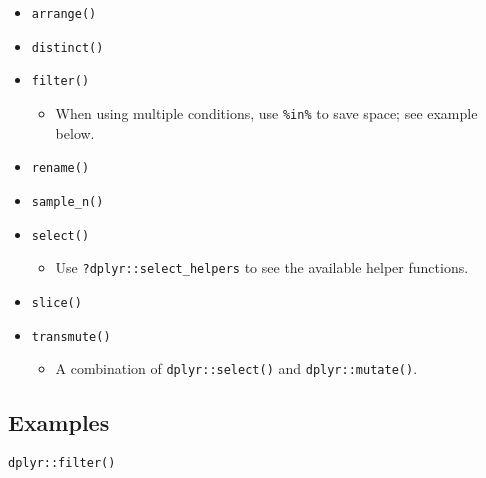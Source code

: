 \documentclass[
]{book}
\newenvironment{Shaded}{\begin{snugshade}}{\end{snugshade}}
\newcommand{\KeywordTok}[1]{\textcolor[rgb]{0.13,0.29,0.53}{\textbf{#1}}}
\newcommand{\NormalTok}[1]{#1}
\newcommand{\OperatorTok}[1]{\textcolor[rgb]{0.81,0.36,0.00}{\textbf{#1}}}
\newcommand{\StringTok}[1]{\textcolor[rgb]{0.31,0.60,0.02}{#1}}
\providecommand{\tightlist}{%
  \setlength{\itemsep}{0pt}\setlength{\parskip}{0pt}}
\begin{document}
\begin{itemize}
\tightlist
\item
  \texttt{arrange()}
\item
  \texttt{distinct()}
\item
  \texttt{filter()}

  \begin{itemize}
  \tightlist
  \item
    When using multiple \texttt{\textbar{}} conditions, use \texttt{\%in\%} to save space; see example below.
  \end{itemize}
\item
  \texttt{rename()}
\item
  \texttt{sample\_n()}
\item
  \texttt{select()}

  \begin{itemize}
  \tightlist
  \item
    Use \texttt{?dplyr::select\_helpers} to see the available helper functions.
  \end{itemize}
\item
  \texttt{slice()}
\item
  \texttt{transmute()}

  \begin{itemize}
  \tightlist
  \item
    A combination of \texttt{dplyr::select()} and \texttt{dplyr::mutate()}.
  \end{itemize}
\end{itemize}

\hypertarget{examples-4}{%
\subsection{Examples}\label{examples-4}}

\texttt{dplyr::filter()}

\begin{Shaded}
\end{Shaded}
\end{document}
